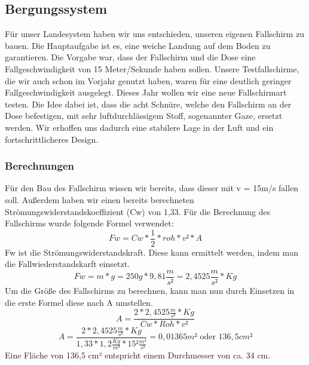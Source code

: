 \subsection{Bergungssystem}
Für unser Landesystem haben wir uns entschieden, unseren eigenen Fallschirm zu bauen. Die Hauptaufgabe ist es, eine weiche Landung auf dem Boden zu garantieren. Die Vorgabe war, dass der Fallschirm und die Dose eine Fallgeschwindigkeit von 15 Meter/Sekunde haben sollen. Unsere Testfallschirme, die wir auch schon im Vorjahr genutzt haben, waren für eine deutlich geringer Fallgeschwindigkeit ausgelegt. Dieses Jahr wollen wir eine neue Fallschirmart testen. Die Idee dabei ist, dass die acht Schnüre, welche den Fallschirm an der Dose befestigen, mit sehr luftdurchlässigem Stoff, sogenannter Gaze, ersetzt werden. Wir erhoffen uns dadurch eine stabilere Lage in der Luft und ein fortschrittlicheres Design.

\subsubsection{Berechnungen}
Für den Bau des Fallschirm wissen wir bereits, dass dieser mit v = 15m/s fallen soll. Außerdem haben wir einen bereits berechneten Strömungswiderstandskoeffizient (Cw) von 1,33. Für die Berechnung des Fallschirms wurde folgende Formel verwendet:
\[
Fw = Cw*\frac{1}{2}*roh*v²*A
\]
Fw ist die Strömungswiderstandskraft. Diese kann ermittelt werden, indem man die Fallwiederstandskarft einsetzt.
\[
Fw = m * g = 250g * 9,81\frac{m}{s²} = 2,4525\frac{m}{s²}*Kg
\]
Um die Größe des Fallschirms zu berechnen, kann man nun durch Einsetzen in die erste Formel diese nach A umstellen.
\[
A=\frac{2*2,4525\frac{m}{s²}*Kg}{Cw*Roh*v²}
\]
\[
A=\frac{2*2,4525\frac{m}{s²}*Kg}{1,33*1,2\frac{Kg}{m³}*15²\frac{m²}{s²}} = 0,01365m² \text{ oder } 136,5cm²
\]
Eine Fläche von 136,5 cm² entspricht einem Durchmesser von ca. 34 cm.

